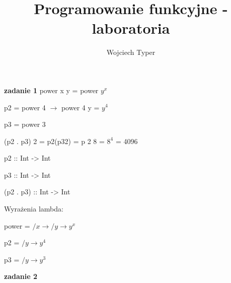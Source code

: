 \documentclass{article}
\title{Programowanie funkcyjne - laboratoria}
\author{Wojciech Typer}
\date{}
\begin{document}
\maketitle
\vspace{1\baselineskip}
\textbf{zadanie 1}
\vspace{1\baselineskip}
power x y = power $y^x$ \par
p2 = power 4 $\rightarrow$ power 4 y = $y^4$ \par
p3 = power 3 \par
(p2 . p3) 2 = p2(p32) = p 2 8 = $8^4$ = 4096 \par
p2 :: Int -> Int \par
p3 :: Int -> Int \par
(p2 . p3) :: Int -> Int \par
Wyrażenia lambda: \par
power = $/x \rightarrow /y \rightarrow y ^ x$ \par
p2 = $/y \rightarrow y ^ 4$ \par
p3 = $/y \rightarrow y ^ 3$ \par
\vspace{1\baselineskip}
\textbf{zadanie 2}
\end{document}
